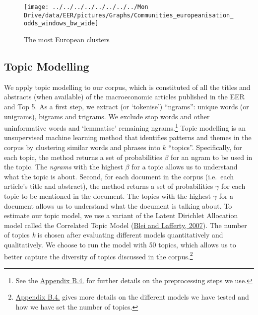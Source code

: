 \documentclass[
  12pt,
  onecolumn]{article}
\begin{document}
\begin{figure}[H]

{\centering \texttt{[image: ../../../../../../../../Mon Drive/data/EER/pictures/Graphs/Communities\_europeanisation\_odds\_windows\_bw\_wide]} 

}

\caption{The most European clusters}\label{fig:plot-community-diff}
\end{figure}

\hypertarget{topic-modelling}{%
\subsection{Topic Modelling}\label{topic-modelling}}

We apply topic modelling to our corpus, which is constituted of all the titles and abstracts (when available) of the macroeconomic articles published in the EER and Top 5. As a first step, we extract (or `tokenise') ``ngrams'': unique words (or unigrams), bigrams and trigrams. We exclude stop words and other uninformative words and `lemmatise' remaining ngrams.\footnote{See the \protect\hyperlink{topic}{Appendix B.4.} for further details on the preprocessing steps we use.} Topic modelling is an unsupervised machine learning method that identifies patterns and themes in the corpus by clustering similar words and phrases into \(k\) ``topics''. Specifically, for each topic, the method returns a set of probabilities \(\beta\) for an ngram to be used in the topic. The \emph{ngrams} with the highest \(\beta\) for a topic allows us to understand what the topic is about. Second, for each document in the corpus (i.e.~each article's title and abstract), the method returns a set of probabilities \(\gamma\) for each topic to be mentioned in the document. The topics with the highest \(\gamma\) for a document allows us to understand what the document is talking about. To estimate our topic model, we use a variant of the Latent Dirichlet Allocation model called the Correlated Topic Model (\protect\hyperlink{ref-blei2007}{Blei and Lafferty, 2007}). The number of topics \emph{k} is chosen after evaluating different models quantitatively and qualitatively. We choose to run the model with 50 topics, which allows us to better capture the diversity of topics discussed in the corpus.\footnote{\protect\hyperlink{topic}{Appendix B.4.} gives more details on the different models we have tested and how we have set the number of topics.}
\end{document}
